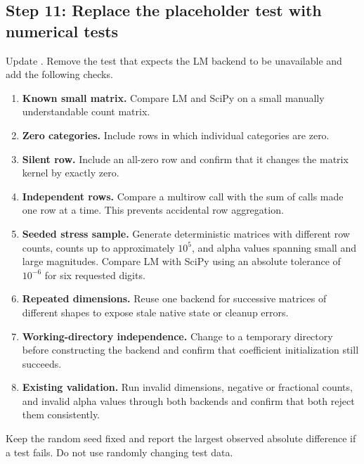 \documentclass[11pt,a4paper]{article}
\begin{document}
\subsection{Step 11: Replace the placeholder test with numerical tests}

Update . Remove the test that expects the LM
backend to be unavailable and add the following checks.

\begin{enumerate}

\item \textbf{Known small matrix.} Compare LM and SciPy on a small manually
understandable count matrix.

\item \textbf{Zero categories.} Include rows in which individual categories
are zero.

\item \textbf{Silent row.} Include an all-zero row and confirm that it changes
the matrix kernel by exactly zero.

\item \textbf{Independent rows.} Compare a multirow call with the sum of calls
made one row at a time. This prevents accidental row aggregation.

\item \textbf{Seeded stress sample.} Generate deterministic matrices with
different row counts, counts up to approximately \(10^5\), and alpha values
spanning small and large magnitudes. Compare LM with SciPy using an absolute
tolerance of \(10^{-6}\) for six requested digits.

\item \textbf{Repeated dimensions.} Reuse one backend for successive matrices
of different shapes to expose stale native state or cleanup errors.

\item \textbf{Working-directory independence.} Change to a temporary directory
before constructing the backend and confirm that coefficient initialization
still succeeds.

\item \textbf{Existing validation.} Run invalid dimensions, negative or
fractional counts, and invalid alpha values through both backends and confirm
that both reject them consistently.

\end{enumerate}

Keep the random seed fixed and report the largest observed absolute difference
if a test fails. Do not use randomly changing test data.
\end{document}
